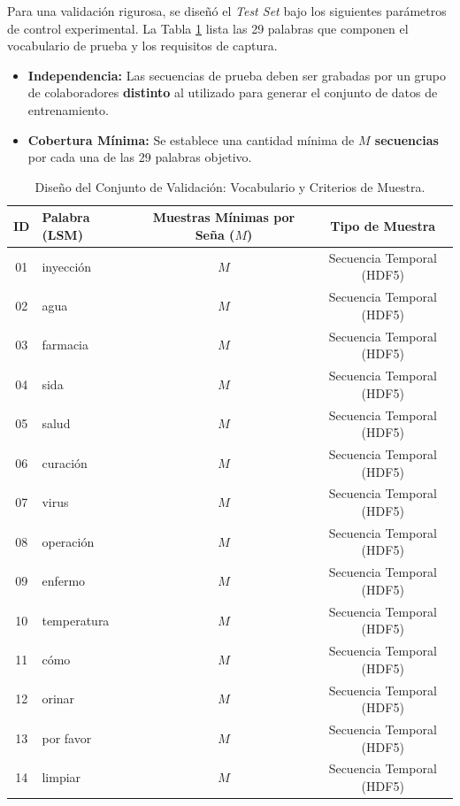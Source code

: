 Para una validación rigurosa, se diseñó el \textit{Test Set} bajo los siguientes parámetros de control experimental. La Tabla \ref{tab:diseño_test_set} lista las 29 palabras que componen el vocabulario de prueba y los requisitos de captura.

\begin{itemize}
    \item \textbf{Independencia:} Las secuencias de prueba deben ser grabadas por un grupo de colaboradores \textbf{distinto} al utilizado para generar el conjunto de datos de entrenamiento.
    \item \textbf{Cobertura Mínima:} Se establece una cantidad mínima de \textbf{$M$ secuencias} por cada una de las 29 palabras objetivo.
\end{itemize}

\begin{table}[H]
    \centering
    \caption{Diseño del Conjunto de Validación: Vocabulario y Criterios de Muestra.}
    \label{tab:diseño_test_set}
    \begin{tabular}{|c|l|c|c|}
        \hline
        \textbf{ID} & \textbf{Palabra (LSM)} & \textbf{Muestras Mínimas por Seña ($M$)} & \textbf{Tipo de Muestra} \\
        \hline
        01 & inyección & $M$ & Secuencia Temporal (HDF5) \\
        02 & agua & $M$ & Secuencia Temporal (HDF5) \\
        03 & farmacia & $M$ & Secuencia Temporal (HDF5) \\
        04 & sida & $M$ & Secuencia Temporal (HDF5) \\
        05 & salud & $M$ & Secuencia Temporal (HDF5) \\
        06 & curación & $M$ & Secuencia Temporal (HDF5) \\
        07 & virus & $M$ & Secuencia Temporal (HDF5) \\
        08 & operación & $M$ & Secuencia Temporal (HDF5) \\
        09 & enfermo & $M$ & Secuencia Temporal (HDF5) \\
        10 & temperatura & $M$ & Secuencia Temporal (HDF5) \\
        11 & cómo & $M$ & Secuencia Temporal (HDF5) \\
        12 & orinar & $M$ & Secuencia Temporal (HDF5) \\
        13 & por favor & $M$ & Secuencia Temporal (HDF5) \\
        14 & limpiar & $M$ & Secuencia Temporal (HDF5) \\

\end{tabular}
\end{table}

